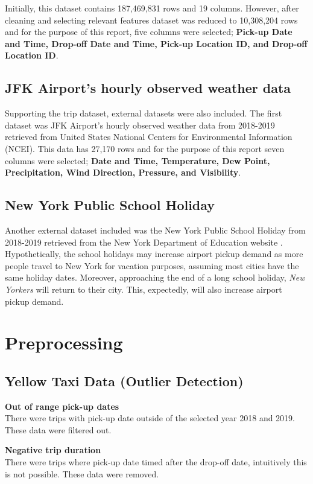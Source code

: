 \documentclass[11pt]{article}
\begin{document}
Initially, this dataset contains 187,469,831 rows and 19 columns. However, after cleaning and selecting relevant features dataset was reduced to 10,308,204 rows and for the purpose of this report, five columns were selected; \textbf{Pick-up Date and Time, Drop-off Date and Time, Pick-up Location ID, and Drop-off Location ID}. 

\subsection{JFK Airport's hourly observed weather data}
Supporting the trip dataset, external datasets were also included. The first dataset was JFK Airport's hourly observed weather data from 2018-2019 retrieved from United States National Centers for Environmental Information (NCEI)\cite{weather}. This data has 27,170 rows and for the purpose of this report seven columns were selected; \textbf{Date and Time, Temperature, Dew Point, Precipitation, Wind Direction, Pressure, and Visibility}.

\subsection{New York Public School Holiday}
Another external dataset included was the New York Public School Holiday from 2018-2019 retrieved from the New York Department of Education website \cite{school}. Hypothetically, the school holidays may increase airport pickup demand as more people travel to New York for vacation purposes, assuming most cities have the same holiday dates. Moreover, approaching the end of a long school holiday, \textit{New Yorkers} will return to their city. This, expectedly, will also increase airport pickup demand. 

\section{Preprocessing}
\subsection{Yellow Taxi Data (Outlier Detection)}
\noindent\textbf{Out of range pick-up dates}
\\
There were trips with pick-up date outside of the selected year 2018 and 2019. These data were filtered out.

\noindent\textbf{Negative trip duration}
\\
There were trips where pick-up date timed after the drop-off date, intuitively this is not possible. These data were removed.
\end{document}
